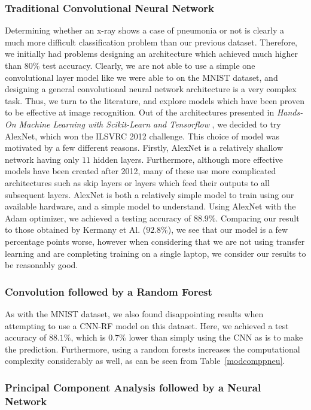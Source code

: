\documentclass[onecolumn,10pt,cleanfoot]{asme2ej}
\begin{document}
\subsubsection{Traditional Convolutional Neural Network}

Determining whether an x-ray shows a case of pneumonia or not is clearly a much more difficult classification problem than our previous dataset. Therefore, we initially had problems designing an architecture which achieved much higher than $80\%$ test accuracy. Clearly, we are not able to use a simple one convolutional layer model like we were able to on the MNIST dataset, and designing a general convolutional neural network architecture is a very complex task. Thus, we turn to the literature, and explore models which have been proven to be effective at image recognition. Out of the architectures presented in {\it Hands-On Machine Learning with Scikit-Learn and Tensorflow} \cite{geron}, we decided to try AlexNet, which won the ILSVRC 2012 challenge. This choice of model was motivated by a few different reasons. Firstly, AlexNet is a relatively shallow network having only $11$ hidden layers. Furthermore, although more effective models have been created after 2012, many of these use more complicated architectures such as skip layers or layers which feed their outputs to all subsequent layers. AlexNet is both a relatively simple model to train using our available hardware, and a simple model to understand. Using AlexNet with the Adam optimizer, we achieved a testing accuracy of $88.9\%$. Comparing our result to those obtained by Kermany et Al. ($92.8\%$), we see that our model is a few percentage points worse, however when considering that we are not using transfer learning and are completing training on a single laptop, we consider our results to be reasonably good.

\subsubsection{Convolution followed by a Random Forest}

As with the MNIST dataset, we also found disappointing results when attempting to use a CNN-RF model on this dataset. Here, we achieved a test accuracy of $88.1\%$, which is $0.7\%$ lower than simply using the CNN as is to make the prediction. Furthermore, using a random forests increases the computational complexity considerably as well, as can be seen from Table~\ref{modcomppneu}.

\subsubsection{Principal Component Analysis followed by a Neural Network}
\end{document}
